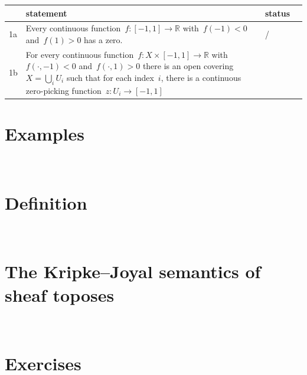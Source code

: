 \documentclass[10pt,reqno,a4paper,openany]{amsbook}
\newcommand{\cmark}{\ding{51}}
\newcommand{\xmark}{\ding{55}}
\theoremstyle{definition}
\theoremstyle{plain}
\theoremstyle{remark}
\newcommand{\RR}{\mathbb{R}}
\newcommand{\?}{\,{:}\,}
\renewcommand{\_}{\mathpunct{.}\,}
\begin{document}

\newpage

\begin{tabular}{@{}lp{}ll@{}}
  \toprule
  & statement & status \\\midrule
  1a & Every continuous function~$f : [-1,1] \to \RR$ with~$f(-1) < 0$
  and~$f(1) > 0$ has a zero. & \cmark/\xmark \\
  1b & For every continuous function~$f : X \times [-1,1] \to \RR$
  with~$f(\cdot,-1) < 0$ and~$f(\cdot,1) > 0$ there is an open covering~$X =
  \bigcup_i U_i$ such that for each index~$i$, there is a continuous
  zero-picking function~$z : U_i \to [-1,1]$
\end{tabular}

\section{Examples}
\newpage
\ \newpage

\section{Definition}
\newpage
\ \newpage

\section{The Kripke--Joyal semantics of sheaf toposes}
\newpage
\ \newpage

\section{Exercises}
\end{document}
